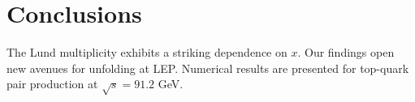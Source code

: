 \section{Conclusions}\label{sec:conclusions}

The Lund multiplicity exhibits a striking dependence on $x$. Our
findings open new avenues for unfolding at LEP. Numerical results are
presented for top-quark pair production at $\sqrt{s} = 91.2$ GeV.

